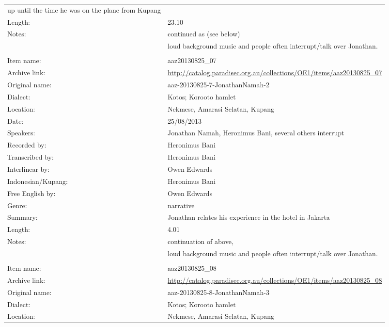 \begin{longtable}{lL{.67\textwidth}}
						up until the time he was on the plane from Kupang\\
Length:				& 23.10\\
Notes:				& continued as  (see below) \\
					& loud background music and people often interrupt/talk over Jonathan.\\ \lspbottomrule
{}			& \\
Item name:			& aaz20130825{\_}07\\
Archive link:			& \url{http://catalog.paradisec.org.au/collections/OE1/items/aaz20130825_07}\\
Original name:			& aaz-20130825-7-JonathanNamah-2\\
Dialect:				& Kotos; Koro{\Q}oto hamlet \\
Location:				& Nekmese{\Q}, Amarasi Selatan, Kupang \\
Date:				& 25/08/2013\\
Speakers:				& Jonathan Namah, Heronimus Bani, several others interrupt \\
Recorded by:			& Heronimus Bani\\
Transcribed by:		& Heronimus Bani\\
Interlinear by:		& Owen Edwards \\
Indonesian/Kupang:		& Heronimus Bani\\
Free English by:		& Owen Edwards\\
Genre:				& narrative\\
Summary:				& Jonathan relates his experience in the hotel in Jakarta\\
Length:				& 4.01\\
Notes:				& continuation of  above, \\
					& loud background music and people often interrupt/talk over Jonathan. \\ \lspbottomrule
{}			& \\
Item name:			& aaz20130825{\_}08\\
Archive link:			& \url{http://catalog.paradisec.org.au/collections/OE1/items/aaz20130825_08}\\
Original name:			& aaz-20130825-8-JonathanNamah-3\\
Dialect:				& Kotos; Koro{\Q}oto hamlet \\
Location:				& Nekmese{\Q}, Amarasi Selatan, Kupang \\

\end{longtable}
